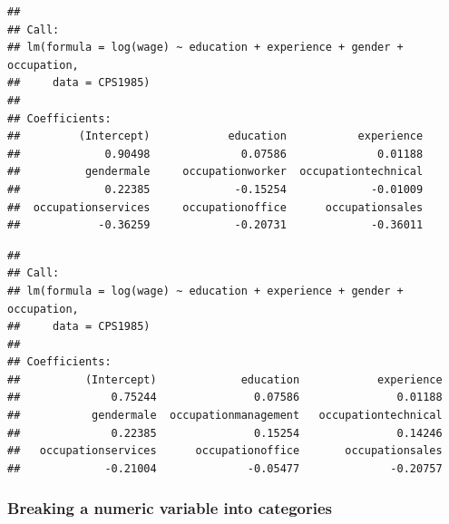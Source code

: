 \documentclass[]{book}
\newenvironment{Shaded}{\begin{snugshade}}{\end{snugshade}}
\newcommand{\CommentTok}[1]{\textcolor[rgb]{0.56,0.35,0.01}{\textit{#1}}}
\newcommand{\DataTypeTok}[1]{\textcolor[rgb]{0.13,0.29,0.53}{#1}}
\newcommand{\KeywordTok}[1]{\textcolor[rgb]{0.13,0.29,0.53}{\textbf{#1}}}
\newcommand{\NormalTok}[1]{#1}
\newcommand{\OperatorTok}[1]{\textcolor[rgb]{0.81,0.36,0.00}{\textbf{#1}}}
\newcommand{\StringTok}[1]{\textcolor[rgb]{0.31,0.60,0.02}{#1}}
\begin{document}
\begin{verbatim}
## 
## Call:
## lm(formula = log(wage) ~ education + experience + gender + occupation, 
##     data = CPS1985)
## 
## Coefficients:
##         (Intercept)            education           experience  
##             0.90498              0.07586              0.01188  
##          gendermale     occupationworker  occupationtechnical  
##             0.22385             -0.15254             -0.01009  
##  occupationservices     occupationoffice      occupationsales  
##            -0.36259             -0.20731             -0.36011
\end{verbatim}

\begin{Shaded}
\end{Shaded}

\begin{verbatim}
## 
## Call:
## lm(formula = log(wage) ~ education + experience + gender + occupation, 
##     data = CPS1985)
## 
## Coefficients:
##          (Intercept)             education            experience  
##              0.75244               0.07586               0.01188  
##           gendermale  occupationmanagement   occupationtechnical  
##              0.22385               0.15254               0.14246  
##   occupationservices      occupationoffice       occupationsales  
##             -0.21004              -0.05477              -0.20757
\end{verbatim}

\hypertarget{breaking-a-numeric-variable-into-categories}{%
\subsubsection{Breaking a numeric variable into
categories}\label{breaking-a-numeric-variable-into-categories}}
\end{document}
